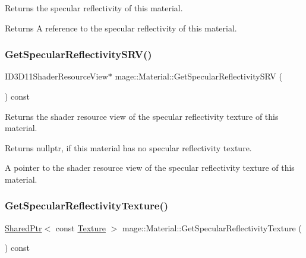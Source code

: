 Returns the specular reflectivity of this material.

\begin{DoxyReturn}{Returns}
A reference to the specular reflectivity of this material. 
\end{DoxyReturn}
\hypertarget{structmage_1_1_material_a04fad2f985ed5078a8217ebcfd51c3f0}{}\label{structmage_1_1_material_a04fad2f985ed5078a8217ebcfd51c3f0} 
\subsubsection{\texorpdfstring{Get\+Specular\+Reflectivity\+S\+R\+V()}{GetSpecularReflectivitySRV()}}
{\footnotesize\ttfamily I\+D3\+D11\+Shader\+Resource\+View$\ast$ mage\+::\+Material\+::\+Get\+Specular\+Reflectivity\+S\+RV (\begin{DoxyParamCaption}{ }\end{DoxyParamCaption}) const\hspace{0.3cm}{\ttfamily [noexcept]}}

Returns the shader resource view of the specular reflectivity texture of this material.

\begin{DoxyReturn}{Returns}
{\ttfamily nullptr}, if this material has no specular reflectivity texture. 

A pointer to the shader resource view of the specular reflectivity texture of this material. 
\end{DoxyReturn}
\hypertarget{structmage_1_1_material_aefec704eaa03726eb569e10f10343c48}{}\label{structmage_1_1_material_aefec704eaa03726eb569e10f10343c48} 
\subsubsection{\texorpdfstring{Get\+Specular\+Reflectivity\+Texture()}{GetSpecularReflectivityTexture()}}
{\footnotesize\ttfamily \hyperlink{namespacemage_a1e01ae66713838a7a67d30e44c67703e}{Shared\+Ptr}$<$ const \hyperlink{classmage_1_1_texture}{Texture} $>$ mage\+::\+Material\+::\+Get\+Specular\+Reflectivity\+Texture (\begin{DoxyParamCaption}{ }\end{DoxyParamCaption}) const\hspace{0.3cm}{\ttfamily [noexcept]}}

